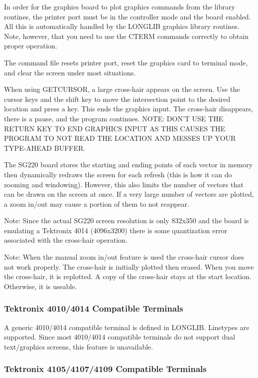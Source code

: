 \documentclass[11pt]{report}
\begin{document}
In order for the graphics board to plot graphics commands from the
library routines, the printer port must be in the controller mode and
the board enabled.  All this is automatically handled by the LONGLIB
graphics library routines.  Note, however, that you need to use
the CTERM commands correctly to obtain proper operation.

The command file  resets printer port, reset the
graphics card to terminal mode, and clear the screen under most
situations.

When using GETCURSOR, a large cross-hair appears on the screen.
Use the cursor keys and the shift key to move the intersection point to
the desired location and press a key.  This ends the graphics input.
The cross-hair disappears, there is a pause, and the program
continues.  NOTE: DON'T USE THE RETURN KEY TO END GRAPHICS INPUT AS
THIS CAUSES THE PROGRAM TO NOT READ THE LOCATION AND MESSES UP YOUR
TYPE-AHEAD BUFFER.

The SG220 board stores the starting and ending points of each vector
in memory then dynamically redraws the screen for each refresh (this
is how it can do zooming and windowing).  However, this also limits
the number of vectors that can be drawn on the screen at once.  If a
very large number of vectors are plotted, a zoom in/out may cause a
portion of them to not reappear.

Note:  Since the actual SG220 screen resolution is only 832x350
and the board is emulating a Tektronix 4014 (4096x3200) there is some
quantization error associated with the cross-hair operation.

Note: When the manual zoom in/out feature is used the cross-hair
cursor does not work properly.  The cross-hair is initially plotted
then erased.  When you move the cross-hair, it is replotted.  A copy
of the cross-hair stays at the start location.  Otherwise, it is
useable.

\subsubsection{Tektronix 4010/4014 Compatible Terminals}

A generic  4010/4014 compatible terminal is defined in
LONGLIB.  Linetypes are supported.  Since most  4010/4014
compatible terminals do not support dual text/graphics screens, this
feature is unavailable. 

\subsubsection{Tektronix 4105/4107/4109 Compatible Terminals}
\end{document}
